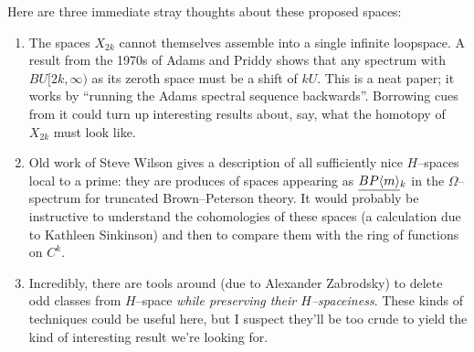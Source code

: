 Here are three immediate stray thoughts about these proposed spaces:
\begin{enumerate}
\item The spaces $X_{2k}$ cannot themselves assemble into a single infinite loopspace. A result from the 1970s of Adams and Priddy shows that any spectrum with $BU[2k, \infty)$ as its zeroth space must be a shift of $kU$.  This is a neat paper; it works by ``running the Adams spectral sequence backwards''.  Borrowing cues from it could turn up interesting results about, say, what the homotopy of $X_{2k}$ must look like.
\item Old work of Steve Wilson gives a description of all sufficiently nice $H$--spaces local to a prime: they are produces of spaces appearing as $\smash{\underline{BP\langle m\rangle}}_{k}$ in the $\Omega$--spectrum for truncated Brown--Peterson theory.  It would probably be instructive to understand the cohomologies of these spaces (a calculation due to Kathleen Sinkinson) and then to compare them with the ring of functions on $C^k$.
\item Incredibly, there are tools around (due to Alexander Zabrodsky) to delete odd classes from $H$--space \emph{while preserving their $H$--spaceiness}.  These kinds of techniques could be useful here, but I suspect they'll be too crude to yield the kind of interesting result we're looking for.
\end{enumerate}


\newpage

